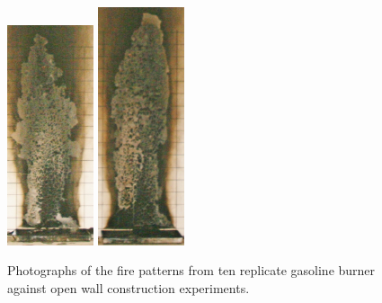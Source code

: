 \documentclass[twoside]{uocthesis}
\begin{document}
{\begin{figure}[p]
	\includegraphics[width=1.0in]{../Figures/GBGAS_33_IMG_6326}
	\includegraphics[width=1.0in]{../Figures/GBGAS_34_IMG_6345} \\

	\caption[Photographs of the fire patterns from 10 replicate gasoline burner against open wall construction experiments.]{Photographs of the fire patterns from ten replicate gasoline burner against open wall construction experiments.}
	\label{Gas_Open_Wall}
\end{figure}


}
\end{document}
